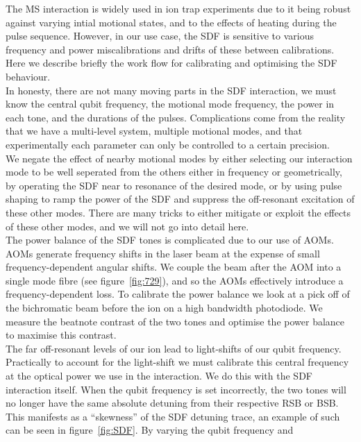     The MS interaction is widely used in ion trap experiments due to it being robust against varying intial motional states, and to the effects of heating during the pulse sequence. However, in our use case, the SDF is sensitive to various frequency and power miscalibrations and drifts of these between calibrations.  Here we describe briefly the work flow for calibrating and optimising the SDF behaviour.\\
    In honesty, there are not many moving parts in the SDF interaction, we must know the central qubit frequency, the motional mode frequency, the power in each tone, and the durations of the pulses. Complications come from the reality that we have a multi-level system, multiple motional modes, and that experimentally each parameter can only be controlled to a certain precision.\\
    We negate the effect of nearby motional modes by either selecting our
    interaction mode to be well seperated from the others either in frequency or geometrically, by
    operating the SDF near to resonance of the desired mode, or by using pulse
    shaping to ramp the power of the SDF and suppress the off-resonant
    excitation of these other modes. There are many tricks to either mitigate or
    exploit the effects of these other modes, and we will not go into detail
    here. \\
    The power balance of the SDF tones is complicated due to our use of AOMs.
    AOMs generate frequency shifts in the laser beam at the expense of small
    frequency-dependent angular shifts. We couple the beam after the AOM into a
    single mode fibre (see figure~\ref{fig:729}), and so the AOMs effectively introduce a
    frequency-dependent loss. To calibrate the power balance we look at a pick
    off of the bichromatic beam before the ion on a high bandwidth photodiode.
    We measure the beatnote contrast of the two tones and optimise the power
    balance to maximise this contrast.\\
    The far off-resonant levels of our ion lead to light-shifts of our qubit
    frequency. Practically to account for the light-shift we must calibrate this central frequency at the
    optical power we use in the interaction. We do this with the SDF interaction
    itself. When the qubit frequency is set incorrectly, the two tones will no
    longer have the same absolute detuning from their respective RSB or BSB.
    This manifests as a ``skewness'' of the SDF detuning trace, an example of
    such can be seen in figure~\ref{fig:SDF}. By varying the qubit frequency and
